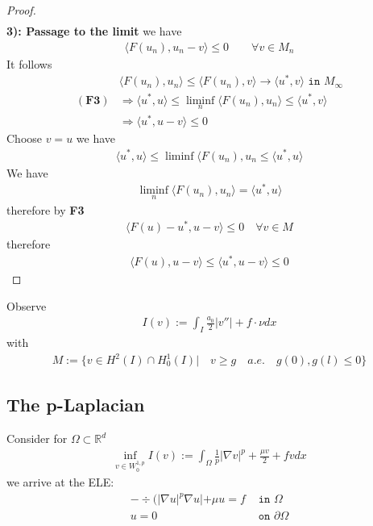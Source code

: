 \begin{proof}
\begin{align*}
	\end{align*}
	\textbf{3): Passage to the limit}
	we have
	\begin{align*}
		\langle F(u_n) , u_n - v \rangle \le 0  \qquad \forall v \in M_n
	\end{align*}
	It follows
	\begin{align*}
		&\langle F(u_n), u_n \rangle \le \langle F(u_n), v \rangle \rightarrow \langle u^*, v \rangle \texttt{ in } M_\infty\\
		(\textbf{F3})
		& \Rightarrow \langle u^*, u \rangle \le   \liminf_n \langle F(u_n), u_n \rangle \le \langle u^*, v \rangle\\
		&\Rightarrow \langle u^*, u - v \rangle \le 0
	\end{align*}
	Choose $v = u$ we have
	\begin{align*}
		\langle u^*, u \rangle \le  \liminf \langle F(u_n), u_n \le \langle u^*, u \rangle 
	\end{align*}
	We have
	\begin{align*}
		\liminf_n \langle F(u_n), u_n \rangle = \langle u^*, u \rangle
	\end{align*}
	therefore by \textbf{F3}
	\begin{align*}
		\langle F(u) - u^*, u - v \rangle \le 0 \quad \forall v \in M
	\end{align*}
	therefore
	\begin{align*}
		\langle F(u), u - v \rangle \le \langle u^*, u - v \rangle \le 0
	\end{align*}
\end{proof}

\begin{example}
	Observe
	\begin{align*}
		I(v) := \int_I \frac{a_0}{2} |v''| + f \cdot \nu  dx 
	\end{align*}
	with 
	\begin{align*}
		M:= \{ v \in H^2(I) \cap H^1_0(I) | \quad v \ge g \quad a.e. \quad g(0), g(l) \le 0 \}
	\end{align*}
\end{example}


\subsection{The p-Laplacian}
Consider for $\Omega \subset \mathbb{R}^d$
\begin{align*}
	\inf_{v \in W^{1, p}_0}I(v):= \int_\Omega \frac{1}{p}|\nabla v |^p + \frac{\mu v }{2} + fv dx 
\end{align*}
we arrive at the ELE:
\begin{align*}
	-\div (|\nabla u |^p \nabla u | + \mu u = f &\texttt{ in } \Omega\\
	u = 0 &\texttt{ on } \partial\Omega
\end{align*}



